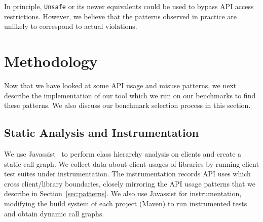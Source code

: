 In principle, \texttt{Unsafe} or its newer equivalents could be used to bypass API access restrictions. However, we believe that the patterns observed in practice are unlikely to correspond to actual violations.










\section{Methodology}
\label{sec:methodology}

Now that we have looked at some API usage and misuse patterns, we next describe the implementation of our tool which we run on our benchmarks to find these patterns.
We also discuss our benchmark selection process in this section.

\subsection{Static Analysis and Instrumentation}
\label{sec:methodology}

We use Javassist~\cite{chiba00:_load_struc_reflec_java} to perform class hierarchy analysis on clients
and create a static call graph. We collect data about client usages of libraries by running client
test suites under instrumentation. The instrumentation records API
uses which cross client/library boundaries, closely mirroring the API
usage patterns that we describe in
Section~\ref{sec:patterns}. We also use Javassist for instrumentation,
modifying the build system of each project (Maven) to run instrumented
tests and obtain dynamic call graphs. 
\\

